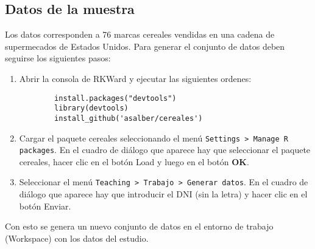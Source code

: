 \documentclass[a4paper,titlepage]{article}
\begin{document}
\subsection*{\color{blueceu}Datos de la muestra}
Los datos corresponden a 76 marcas cereales vendidas en una cadena de supermecados de Estados Unidos.
Para generar el conjunto de datos deben seguirse los siguientes pasos:
\begin{enumerate}
	\item Abrir la consola de RKWard y ejecutar las siguientes ordenes:
	\begin{verbatim}
		install.packages("devtools")
		library(devtools)
		install_github('asalber/cereales')
	\end{verbatim}
	\item Cargar el paquete \textsf{cereales} seleccionando el menú \texttt{Settings > Manage R packages}. En el cuadro de diálogo que aparece hay que seleccionar el paquete \textsf{cereales}, hacer clic en el botón \textsf{Load} y luego en el botón \textbf{OK}.
	\item Seleccionar el menú \texttt{Teaching > Trabajo > Generar datos}. En el cuadro de diálogo que aparece hay que introducir el DNI (sin la letra) y hacer clic en el botón \textsf{Enviar}.
\end{enumerate}
Con esto se genera un nuevo conjunto de datos en el entorno de trabajo (Workspace) con los datos del estudio.
\end{document}

